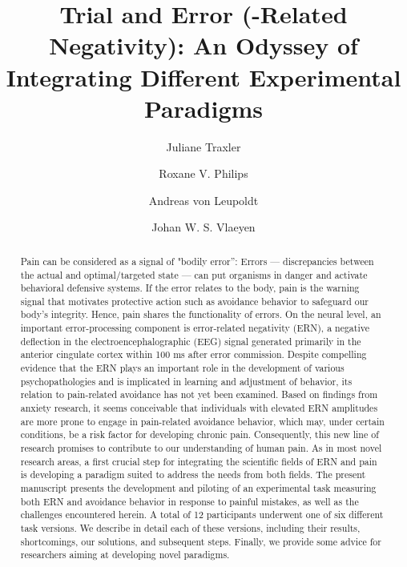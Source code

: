 \documentclass[twocolumn, serif, authordate, empirical]{jote-article}
\title{Trial and Error (-Related Negativity):\text{ }\hspace{\textwidth} An Odyssey of Integrating Different Experimental Paradigms}
\author[1,2\authfn{2}]{Juliane Traxler}
\author[1\authfn{2}]{Roxane V. Philips}
\author[1]{Andreas von Leupoldt}
\author[1,2]{\hspace{\textwidth}Johan W. S. Vlaeyen}
\affil[1]{Research Group Health Psychology, KU Leuven, Leuven, Belgium}
\affil[2]{Experimental Health Psychology, Maastricht University, Maastricht, The Netherlands}
\begin{document}
\begin{frontmatter}
\maketitle
\begin{abstract}
    Pain can be considered as a signal of "bodily error'': Errors — discrepancies between the actual and optimal/targeted state — can put organisms in danger and activate behavioral defensive systems. If the error relates to the body, pain is the warning signal that motivates protective action such as avoidance behavior to safeguard our body's integrity. Hence, pain shares the functionality of errors. On the neural level, an important error-processing component is error-related negativity (ERN), a negative deflection in the electroencephalographic (EEG) signal generated primarily in the anterior cingulate cortex within 100 ms after error commission. Despite compelling evidence that the ERN plays an important role in the development of various psychopathologies and is implicated in learning and adjustment of behavior, its relation to pain-related avoidance has not yet been examined. Based on findings from anxiety research, it seems conceivable that individuals with elevated ERN amplitudes are more prone to engage in pain-related avoidance behavior, which may, under certain conditions, be a risk factor for developing chronic pain. Consequently, this new line of research promises to contribute to our understanding of human pain. As in most novel research areas, a first crucial step for integrating the scientific fields of ERN and pain is developing a paradigm suited to address the needs from both fields. The present manuscript presents the development and piloting of an experimental task measuring both ERN and avoidance behavior in response to painful mistakes, as well as the challenges encountered herein. A total of 12 participants underwent one of six different task versions. We describe in detail each of these versions, including their results, shortcomings, our solutions, and subsequent steps. Finally, we provide some advice for researchers aiming at developing novel paradigms.
\end{abstract}
\end{frontmatter}
\setcounter{page}{27}
\end{document}
